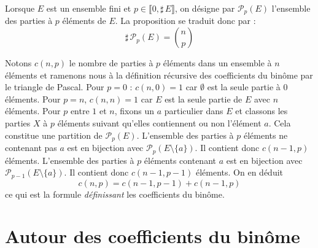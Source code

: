 \begin{rem}
 Lorsque $E$ est un ensemble fini et $p\in\llbracket 0, \sharp\,E\rrbracket$, on désigne par $\mathcal P_p(E)$ l'ensemble des parties à $p$ éléments de $E$. La proposition se traduit donc par :
\begin{displaymath}
 \sharp\,\mathcal P_p(E) = \binom{n}{p}
\end{displaymath}
\end{rem}
\begin{demo}
 Notons $c(n,p)$ le nombre de parties à $p$ éléments dans un ensemble à $n$ éléments et ramenons nous à la définition récursive des coefficients du binôme par le triangle de Pascal.\newline
Pour $p=0$ : $c(n,0)=1$ car $\emptyset$ est la seule partie à $0$ éléments. Pour $p=n$, $c(n,n)=1$ car $E$ est la seule partie de $E$ avec $n$ éléments.\newline
Pour $p$ entre $1$ et $n$, fixons un $a$ particulier dans $E$ et classons les parties $X$ à $p$ éléments suivant qu'elles contiennent ou non l'élément $a$. Cela constitue une partition de $\mathcal P_p(E)$.\newline
L'ensemble des parties à $p$ éléments ne contenant pas $a$ est en bijection avec $\mathcal P_p(E\setminus\{a\})$. Il contient donc $c(n-1,p)$ éléments.\newline
L'ensemble des parties à $p$ éléments contenant $a$ est en bijection avec $\mathcal P_{p-1}(E\setminus\{a\})$. Il contient donc $c(n-1,p-1)$ éléments. On en déduit
\begin{displaymath}
 c(n,p) = c(n-1,p-1) + c(n-1,p)
\end{displaymath}
 ce qui est la formule \emph{définissant} les coefficients du binôme.

\section{Autour des coefficients du binôme}

\end{demo}
